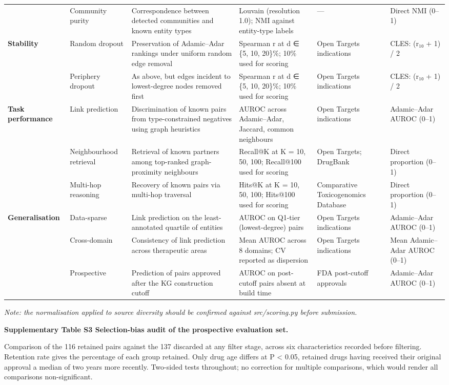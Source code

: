\begin{longtable}[]{@{}llllll@{}}
& Community purity & Correspondence between detected communities and known entity types & Louvain (resolution 1.0); NMI against entity-type labels & --- & Direct NMI (0--1)\tabularnewline
\textbf{Stability} & Random dropout & Preservation of Adamic--Adar rankings under uniform random edge removal & Spearman r at d ∈ \{5, 10, 20\}\%; 10\% used for scoring & Open Targets indications & CLES: (r₁₀ + 1) / 2\tabularnewline
& Periphery dropout & As above, but edges incident to lowest-degree nodes removed first & Spearman r at d ∈ \{5, 10, 20\}\%; 10\% used for scoring & Open Targets indications & CLES: (r₁₀ + 1) / 2\tabularnewline
\textbf{Task performance} & Link prediction & Discrimination of known pairs from type-constrained negatives using graph heuristics & AUROC across Adamic--Adar, Jaccard, common neighbours & Open Targets indications & Adamic--Adar AUROC (0--1)\tabularnewline
& Neighbourhood retrieval & Retrieval of known partners among top-ranked graph-proximity neighbours & Recall@K at K = 10, 50, 100; Recall@100 used for scoring & Open Targets; DrugBank & Direct proportion (0--1)\tabularnewline
& Multi-hop reasoning & Recovery of known pairs via multi-hop traversal & Hits@K at K = 10, 50, 100; Hits@100 used for scoring & Comparative Toxicogenomics Database & Direct proportion (0--1)\tabularnewline
\textbf{Generalisation} & Data-sparse & Link prediction on the least-annotated quartile of entities & AUROC on Q1-tier (lowest-degree) pairs & Open Targets indications & Adamic--Adar AUROC (0--1)\tabularnewline
& Cross-domain & Consistency of link prediction across therapeutic areas & Mean AUROC across 8 domains; CV reported as dispersion & Open Targets indications & Mean Adamic--Adar AUROC (0--1)\tabularnewline
& Prospective & Prediction of pairs approved after the KG construction cutoff & AUROC on post-cutoff pairs absent at build time & FDA post-cutoff approvals & Adamic--Adar AUROC (0--1)\tabularnewline
\bottomrule
\end{longtable}

\emph{Note: the normalisation applied to source diversity should be confirmed against src/scoring.py before submission.}

\textbf{Supplementary Table S3 \textbar{} Selection-bias audit of the prospective evaluation set.}

Comparison of the 116 retained pairs against the 137 discarded at any filter stage, across six characteristics recorded before filtering. Retention rate gives the percentage of each group retained. Only drug age differs at P \textless{} 0.05, retained drugs having received their original approval a median of two years more recently. Two-sided tests throughout; no correction for multiple comparisons, which would render all comparisons non-significant.

